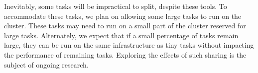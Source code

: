 Inevitably, some tasks will be impractical to split, despite these tools.
To accommodate these
tasks, we plan on allowing some large tasks to run on the cluster. These tasks
may need to run on a small part of the cluster reserved for large tasks.
Alternately, we expect that if a small percentage of tasks remain large, they
can be run on the same infrastructure as tiny tasks without impacting the
performance of remaining tasks. Exploring the effects of such sharing is
the subject of ongoing research.
